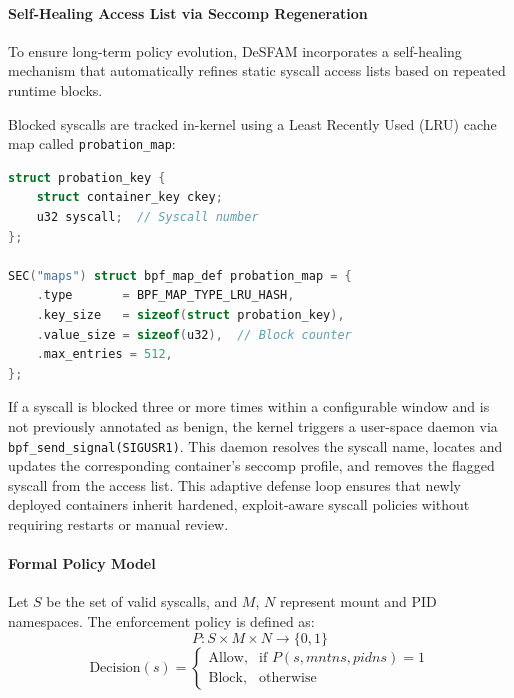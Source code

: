 \paragraph{Self-Healing Access List via Seccomp Regeneration}
To ensure long-term policy evolution, DeSFAM incorporates a self-healing mechanism that
automatically refines static syscall access lists based on repeated runtime blocks.

Blocked syscalls are tracked in-kernel using a Least Recently Used (LRU) cache map called
\texttt{probation\_map}:

\begin{lstlisting}[float=htbp, language=C, caption={Probation map for tracking repeated blocks.}]
struct probation_key {
    struct container_key ckey;
    u32 syscall;  // Syscall number
};

SEC("maps") struct bpf_map_def probation_map = {
    .type       = BPF_MAP_TYPE_LRU_HASH,
    .key_size   = sizeof(struct probation_key),
    .value_size = sizeof(u32),  // Block counter
    .max_entries = 512,
};
\end{lstlisting}

If a syscall is blocked three or more times within a configurable window and is not previously
annotated as benign, the kernel triggers a user-space daemon via
\texttt{bpf\_send\_signal(SIGUSR1)}. This daemon resolves the syscall name, locates and updates
the corresponding container's seccomp profile, and removes the flagged syscall from the access
list. This adaptive defense loop ensures that newly deployed containers inherit hardened,
exploit-aware syscall policies without requiring restarts or manual review.

\paragraph{Formal Policy Model}
Let $S$ be the set of valid syscalls, and $M$, $N$ represent mount and PID namespaces. The
enforcement policy is defined as:
\begin{equation}
  P : S \times M \times N \to \{0, 1\}
  \label{eq:policy_func}
\end{equation}
\begin{equation}
  \text{Decision}(s) =
  \begin{cases}
    \text{Allow}, & \text{if } P(s, \mathit{mntns}, \mathit{pidns}) = 1 \\
    \text{Block},  & \text{otherwise}
  \end{cases}
  \label{eq:decision}
\end{equation}

